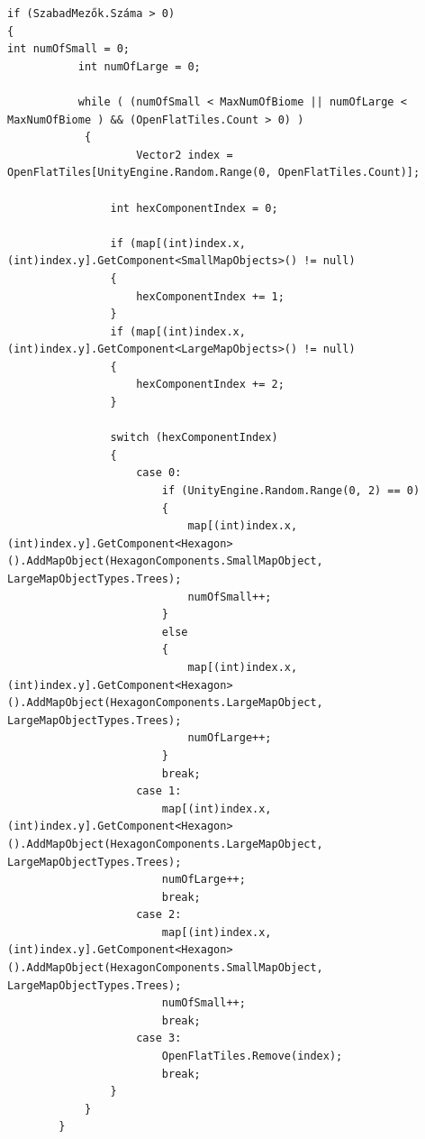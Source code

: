 \begin{verbatim}
if (SzabadMezők.Száma > 0)
{
int numOfSmall = 0;
           int numOfLarge = 0;

           while ( (numOfSmall < MaxNumOfBiome || numOfLarge < MaxNumOfBiome ) && (OpenFlatTiles.Count > 0) )
            {
                	Vector2 index = OpenFlatTiles[UnityEngine.Random.Range(0, OpenFlatTiles.Count)];
                
                int hexComponentIndex = 0;

                if (map[(int)index.x, (int)index.y].GetComponent<SmallMapObjects>() != null)
                {
                    hexComponentIndex += 1;
                }
                if (map[(int)index.x, (int)index.y].GetComponent<LargeMapObjects>() != null)
                {
                    hexComponentIndex += 2;
                }

                switch (hexComponentIndex)
                {
                    case 0:
                        if (UnityEngine.Random.Range(0, 2) == 0)
                        {
                            map[(int)index.x, (int)index.y].GetComponent<Hexagon>().AddMapObject(HexagonComponents.SmallMapObject, LargeMapObjectTypes.Trees);
                            numOfSmall++;
                        }
                        else
                        {
                            map[(int)index.x, (int)index.y].GetComponent<Hexagon>().AddMapObject(HexagonComponents.LargeMapObject, LargeMapObjectTypes.Trees);
                            numOfLarge++;
                        }
                        break;
                    case 1:
                        map[(int)index.x, (int)index.y].GetComponent<Hexagon>().AddMapObject(HexagonComponents.LargeMapObject, LargeMapObjectTypes.Trees);
                        numOfLarge++;
                        break;
                    case 2:
                        map[(int)index.x, (int)index.y].GetComponent<Hexagon>().AddMapObject(HexagonComponents.SmallMapObject, LargeMapObjectTypes.Trees);
                        numOfSmall++;
                        break;
                    case 3:
                        OpenFlatTiles.Remove(index);
                        break;
                }
            }
        }
\end{verbatim}